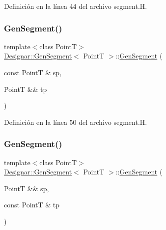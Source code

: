 Definición en la línea 44 del archivo segment.\+H.

\mbox{\label{class_designar_1_1_gen_segment_a504a48917f78ebaae01c2a1a598d1700}} 
\subsubsection{\texorpdfstring{Gen\+Segment()}{GenSegment()}\hspace{0.1cm}{\footnotesize\ttfamily [3/7]}}
{\footnotesize\ttfamily template$<$class PointT$>$ \\
\hyperlink{class_designar_1_1_gen_segment}{Designar\+::\+Gen\+Segment}$<$ PointT $>$\+::\hyperlink{class_designar_1_1_gen_segment}{Gen\+Segment} (\begin{DoxyParamCaption}\item[{const PointT \&}]{sp,  }\item[{PointT \&\&}]{tp }\end{DoxyParamCaption})\hspace{0.3cm}{\ttfamily [inline]}}



Definición en la línea 50 del archivo segment.\+H.

\mbox{\label{class_designar_1_1_gen_segment_a6190cba1e40d5d18dc1853368da957dc}} 
\subsubsection{\texorpdfstring{Gen\+Segment()}{GenSegment()}\hspace{0.1cm}{\footnotesize\ttfamily [4/7]}}
{\footnotesize\ttfamily template$<$class PointT$>$ \\
\hyperlink{class_designar_1_1_gen_segment}{Designar\+::\+Gen\+Segment}$<$ PointT $>$\+::\hyperlink{class_designar_1_1_gen_segment}{Gen\+Segment} (\begin{DoxyParamCaption}\item[{PointT \&\&}]{sp,  }\item[{const PointT \&}]{tp }\end{DoxyParamCaption})\hspace{0.3cm}{\ttfamily [inline]}}



